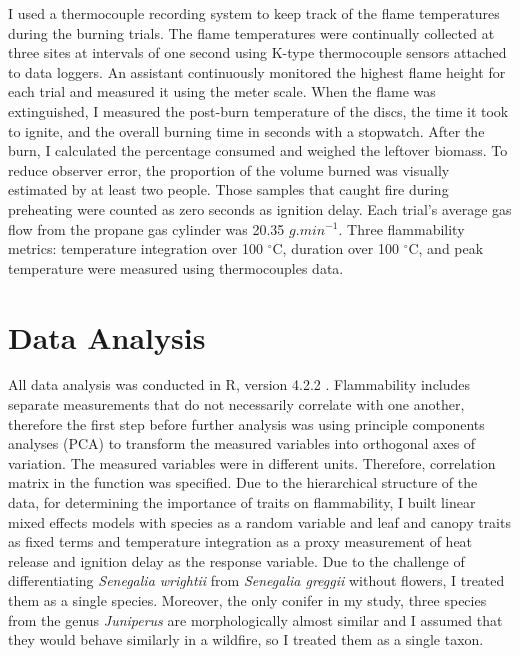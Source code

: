 \documentclass[12pt]{report}
\begin{document}
I used a thermocouple recording system to keep track of the flame temperatures during the burning trials. The flame temperatures were continually collected at three sites at intervals of one second using K-type thermocouple sensors attached to data loggers. An assistant continuously monitored the highest flame height for each trial and measured it using the meter scale. When the flame was extinguished, I measured the post-burn temperature of the discs, the time it took to ignite, and the overall burning time in seconds with a stopwatch. After the burn, I calculated the percentage consumed and weighed the leftover biomass. To reduce observer error, the proportion of the volume burned was visually estimated by at least two people. Those samples that caught fire during preheating were counted as zero seconds as ignition delay. Each trial's average gas flow from the propane gas cylinder was 20.35 ${g.min^{-1}}$. Three flammability metrics: temperature integration over 100 $^{\circ}$C, duration over 100 $^{\circ}$C, and peak temperature were measured using thermocouples data.

\section{Data Analysis}

All data analysis was conducted in R, version 4.2.2 \citep{team2013r}. Flammability includes separate measurements that do not necessarily correlate with one another, therefore the first step before further analysis was using principle components analyses (PCA) to transform the measured variables into orthogonal axes of variation. The measured variables were in different units. Therefore, correlation matrix in the  function was specified. Due to the hierarchical structure of the data, for determining the importance of traits on flammability, I built linear mixed effects models with species as a random variable and leaf and canopy traits as fixed terms and temperature integration as a proxy measurement of heat release and ignition delay as the response variable. Due to the challenge of differentiating \emph{Senegalia wrightii} from \emph{Senegalia greggii} without flowers, I treated them as a single species. Moreover, the only conifer in my study, three species from the genus \emph{Juniperus} are morphologically almost similar and I assumed that they would behave similarly in a wildfire, so I treated them as a single taxon.\\
\end{document}
